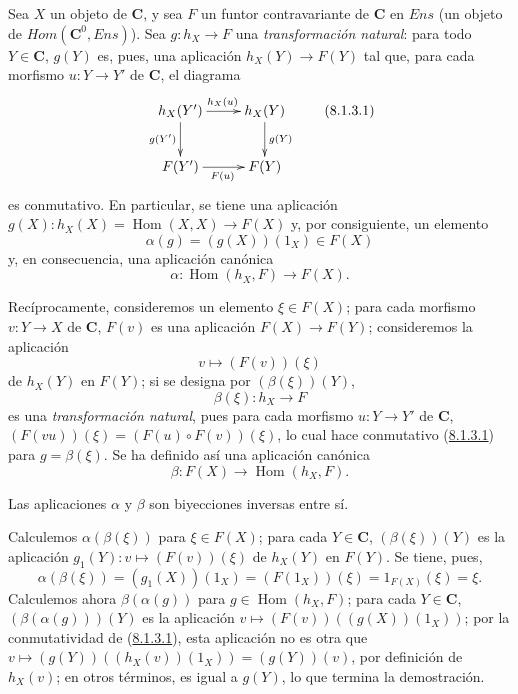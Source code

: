 \begin{env}[8.1.3]
\label{0.8.1.3}
\label{0.8.1.3-fr}
Sea $X$ un objeto de $\boldsymbol{C}$, y sea $F$ un funtor contravariante de $\boldsymbol{C}$ en $\boldsymbol{\mathit{Ens}}$
(un objeto de $\boldsymbol{\mathit{Hom}}(\boldsymbol{C}^0,\boldsymbol{\mathit{Ens}})$). Sea $g:h_X\to F$ una \emph{transformación natural}: para todo $Y\in\boldsymbol{C}$,
$g(Y)$ es, pues, una aplicación $h_X(Y)\to F(Y)$ tal que, para cada morfismo $u:Y\to Y'$ de $\boldsymbol{C}$,
el diagrama
\[
  \xymatrix{
    h_X(Y')\ar[r]^{h_X(u)}\ar[d]_{g(Y')} &
    h_X(Y)\ar[d]^{g(Y)}\\
    F(Y')\ar[r]_{F(u)} & F(Y)
  }
  \tag{8.1.3.1}\label{0.8.1.3.1-fr}
\]
es conmutativo. En particular, se tiene una aplicación $g(X):h_X(X)=\operatorname{Hom}(X,X)\to F(X)$ y, por consiguiente, un elemento
\[
  \alpha(g)=(g(X))(1_X)\in F(X)
  \tag{8.1.3.2}
\]
y, en consecuencia, una aplicación canónica
\[
  \alpha:\operatorname{Hom}(h_X,F)\to F(X).
  \tag{8.1.3.3}
\]

Recíprocamente, consideremos un elemento $\xi\in F(X)$; para cada morfismo $v:Y\to X$ de $\boldsymbol{C}$, $F(v)$ es una
aplicación $F(X)\to F(Y)$; consideremos la aplicación
\[
  v\mapsto(F(v))(\xi)
  \tag{8.1.3.4}
\]
de $h_X(Y)$ en $F(Y)$; si se designa por $(\beta(\xi))(Y)$,
\[
  \beta(\xi):h_X\to F
  \tag{8.1.3.5}
\]
es una \emph{transformación natural}, pues para cada morfismo $u:Y\to Y'$ de $\boldsymbol{C}$,
$(F(vu))(\xi)=(F(u)\circ F(v))(\xi)$, lo cual hace conmutativo (\hyperref[0.8.1.3.1]{8.1.3.1}) para $g=\beta(\xi)$.
Se ha definido así una aplicación canónica
\[
  \beta:F(X)\to\operatorname{Hom}(h_X,F).
  \tag{8.1.3.6}
\]
\end{env}

\begin{proposition}[8.1.4]
\label{0.8.1.4}
\label{0.8.1.4-fr}
Las aplicaciones $\alpha$ y $\beta$ son biyecciones inversas entre sí.
\end{proposition}


Calculemos $\alpha(\beta(\xi))$ para $\xi\in F(X)$; para cada $Y\in\boldsymbol{C}$, $(\beta(\xi))(Y)$ es la aplicación
$g_1(Y):v\mapsto(F(v))(\xi)$ de $h_X(Y)$ en $F(Y)$. Se tiene, pues,
\[
  \alpha(\beta(\xi))=(g_1(X))(1_X)=(F(1_X))(\xi)
  =1_{F(X)}(\xi)=\xi.
\]
Calculemos ahora $\beta(\alpha(g))$ para $g\in\operatorname{Hom}(h_X,F)$; para cada $Y\in\boldsymbol{C}$, $(\beta(\alpha(g)))(Y)$
es la aplicación $v\mapsto(F(v))((g(X))(1_X))$; por la conmutatividad de (\hyperref[0.8.1.3.1]{8.1.3.1}), esta aplicación
no es otra que $v\mapsto(g(Y))((h_X(v))(1_X))=(g(Y))(v)$, por definición de $h_X(v)$; en otros términos,
es igual a $g(Y)$, lo que termina la demostración.


